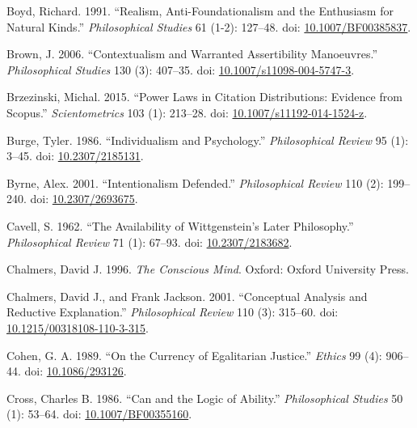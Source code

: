 \documentclass[
  10pt,
  letterpaper,
  DIV=11,
  numbers=noendperiod,
  twoside]{scrartcl}
\newlength{\cslhangindent}
\newenvironment{CSLReferences}[2] %
 {\begin{list}{}{%
  \setlength{\itemindent}{0pt}
  \setlength{\leftmargin}{0pt}
  \setlength{\parsep}{0pt}
  \ifodd #1
   \setlength{\leftmargin}{\cslhangindent}
   \setlength{\itemindent}{-1\cslhangindent}
  \fi
  \setlength{\itemsep}{#2\baselineskip}}}
 {\end{list}}
\begin{document}
\begin{CSLReferences}{1}{0}
Boyd, Richard. 1991. {``Realism, Anti-Foundationalism and the Enthusiasm
for Natural Kinds.''} \emph{Philosophical Studies} 61 (1-2): 127--48.
doi: \href{https://doi.org/10.1007/BF00385837}{10.1007/BF00385837}.

Brown, J. 2006. {``Contextualism and Warranted Assertibility
Manoeuvres.''} \emph{Philosophical Studies} 130 (3): 407--35. doi:
\href{https://doi.org/10.1007/s11098-004-5747-3}{10.1007/s11098-004-5747-3}.

Brzezinski, Michal. 2015. {``Power Laws in Citation Distributions:
Evidence from Scopus.''} \emph{Scientometrics} 103 (1): 213--28. doi:
\href{https://doi.org/10.1007/s11192-014-1524-z}{10.1007/s11192-014-1524-z}.

Burge, Tyler. 1986. {``Individualism and Psychology.''}
\emph{Philosophical Review} 95 (1): 3--45. doi:
\href{https://doi.org/10.2307/2185131}{10.2307/2185131}.

Byrne, Alex. 2001. {``Intentionalism Defended.''} \emph{Philosophical
Review} 110 (2): 199--240. doi:
\href{https://doi.org/10.2307/2693675}{10.2307/2693675}.

Cavell, S. 1962. {``The Availability of Wittgenstein's Later
Philosophy.''} \emph{Philosophical Review} 71 (1): 67--93. doi:
\href{https://doi.org/10.2307/2183682}{10.2307/2183682}.

Chalmers, David J. 1996. \emph{The Conscious Mind}. Oxford: Oxford
University Press.

Chalmers, David J., and Frank Jackson. 2001. {``Conceptual Analysis and
Reductive Explanation.''} \emph{Philosophical Review} 110 (3): 315--60.
doi:
\href{https://doi.org/10.1215/00318108-110-3-315}{10.1215/00318108-110-3-315}.

Cohen, G. A. 1989. {``On the Currency of Egalitarian Justice.''}
\emph{Ethics} 99 (4): 906--44. doi:
\href{https://doi.org/10.1086/293126}{10.1086/293126}.

Cross, Charles B. 1986. {``Can and the Logic of Ability.''}
\emph{Philosophical Studies} 50 (1): 53--64. doi:
\href{https://doi.org/10.1007/BF00355160}{10.1007/BF00355160}.


\end{CSLReferences}
\end{document}
